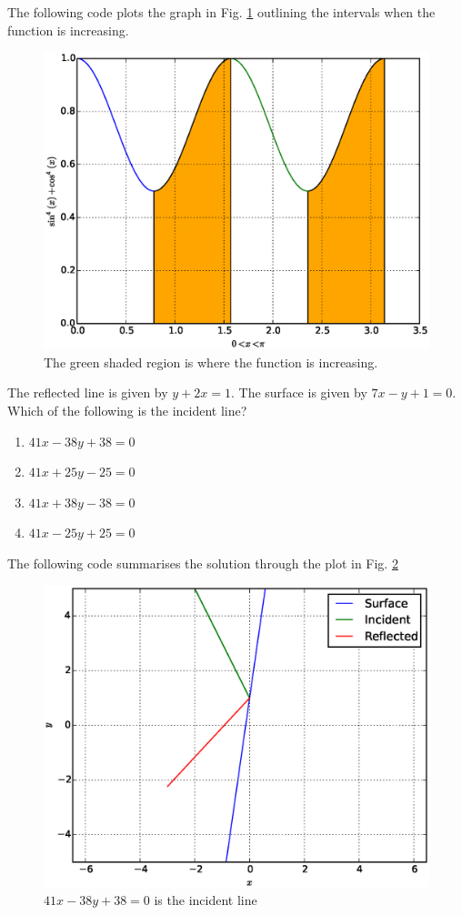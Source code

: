 \documentclass[journal,12pt,twocolumn]{IEEEtran}
\begin{document}
\solution The following code plots the graph in Fig. \ref{fig_20} outlining the intervals when the function is increasing.

%
\begin{figure}[h]
\centering
\includegraphics[width=\columnwidth]{./figs/ee16b1020}
\caption{ The green shaded region is where the function is increasing.}
\label{fig_20}	
\end{figure}
%
\begin{problem}
The reflected line is given by $y+2x=1$. The surface is given by $7x-y+1=0$. Which of the following is the incident line?
\begin{enumerate}
\item $41x - 38y +38 = 0$
\item $41x +25y - 25 = 0$
\item $41x + 38y-38=0$
\item $41x-25y+25=0$
\end{enumerate}
\end{problem}
\solution

The following code  summarises the solution through the plot in Fig. \ref{fig_21}

%
\begin{figure}[h]
\centering
\includegraphics[width=\columnwidth]{./figs/ee16b1021}
\caption{ $41x - 38y +38 = 0$ is the incident line}
\label{fig_21}	
\end{figure}
\end{document}
